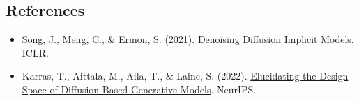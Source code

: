 \FloatBarrier
{}
\hypertarget{references-132}{%
\subsection{References}\label{references-132}}

\vspace{0.25em}
\begin{itemize}
\tightlist
\item
  Song, J., Meng, C., \& Ermon, S. (2021). \href{https://arxiv.org/abs/2010.02502}{Denoising Diffusion Implicit Models}. ICLR.
\item
  Karras, T., Aittala, M., Aila, T., \& Laine, S. (2022). \href{https://arxiv.org/abs/2206.00364}{Elucidating the Design Space of Diffusion-Based Generative Models}. NeurIPS.
\end{itemize}

\clearpage
